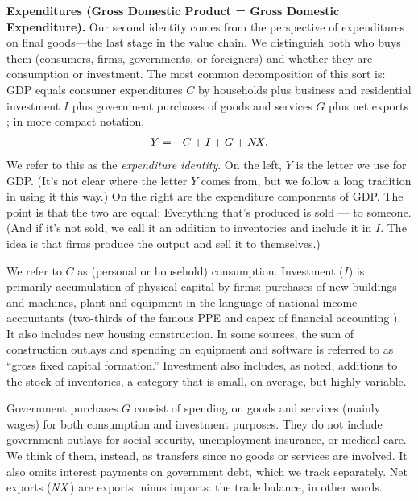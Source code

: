 \textbf{Expenditures (Gross Domestic Product = Gross Domestic Expenditure).    }
%
Our second identity comes from the perspective of expenditures on final goods---the last stage in the value chain. We distinguish both who buys them (consumers, firms, governments, or foreigners)
and whether they are consumption or investment.
The most common decomposition
of this sort is: GDP equals consumer expenditures $C$ by households
plus business and residential investment $I$
plus government purchases of goods and services $G$
plus net exports \NX; in more compact notation,
\begin{eqnarray}
    Y &=& C+I+G+\mbox{\em NX\/} .
    \label{eq:exp-identity}
\end{eqnarray}
We refer to this as the {\it expenditure identity\/}.
On the left, $Y$ is the letter we use for GDP.
(It's not clear where the letter $Y$ comes from, but we follow a long tradition in using it this way.)
On the right are the expenditure components of GDP.
The point is that the two are equal:
Everything that's produced is sold --- to someone.
(And if it's not sold, we call it an addition to inventories
and include it in $I$.
The idea is that firms produce the output and sell it to themselves.)


We refer to $C$ as (personal or household) consumption.
Investment 
 ($I$) is primarily accumulation of physical capital  by firms:
purchases of new buildings and machines, plant and equipment in
the language of national income accountants (two-thirds of the
famous PPE and capex of financial accounting
). It also includes new housing construction.
In some sources, the sum of construction outlays and spending on equipment and software is referred to as ``gross fixed capital formation.''
Investment also includes, as noted, additions to the stock of inventories,
a category that is small, on average, but highly variable.


Government purchases
$G$ consist of spending on goods and
services (mainly wages) for both consumption and investment purposes.
They do not include government outlays
for social security, unemployment insurance, or medical care.
We think of them, instead, as transfers since no goods or
services are involved.
It also omits interest payments on government debt, which we track separately.
Net exports 
 ($\mbox{\em NX\/}$) are exports minus imports: the   trade balance, 
 in other words.

